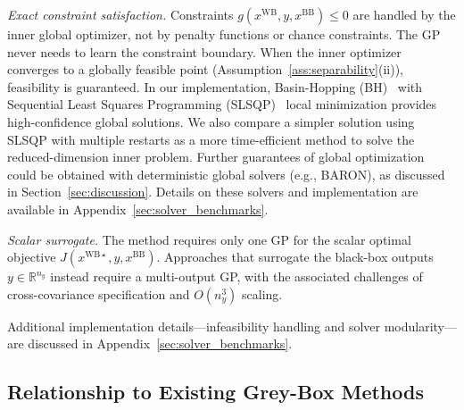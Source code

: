 \documentclass[12pt,a4paper]{article}%
\theoremstyle{plain}%
\theoremstyle{remark}%
\theoremstyle{definition}%
\def\WB{\mathrm{WB}}
\def\BB{\mathrm{BB}}
\begin{document}
\emph{Exact constraint satisfaction.} Constraints $g(x^{\WB}, y, x^{\BB}) \leq 0$ are handled by the inner global optimizer, not by penalty functions or chance constraints. The GP never needs to learn the constraint boundary. When the inner optimizer converges to a globally feasible point (Assumption~\ref{ass:separability}(ii)), feasibility is guaranteed. In our implementation, Basin-Hopping (BH)~\cite{wales2003energy,wales1997global, li1987monte, wales1999global, olson2012basin} with Sequential Least Squares Programming (SLSQP)~\cite{nocedal2006numerical, kraft1988software, lawson1995solving} local minimization provides high-confidence global solutions. We also compare a simpler solution using SLSQP with multiple restarts as a more time-efficient method to solve the reduced-dimension inner problem. Further guarantees of global optimization could be obtained with deterministic global solvers (e.g., BARON), as discussed in Section~\ref{sec:discussion}. Details on these solvers and implementation are available in Appendix~\ref{sec:solver_benchmarks}.

\emph{Scalar surrogate.} The method requires only one GP for the scalar optimal objective $J(x^{\WB\star}, y, x^{\BB})$. Approaches that surrogate the black-box outputs $y \in \mathbb{R}^{n_y}$ instead require a multi-output GP, with the associated challenges of cross-covariance specification and $O(n_y^3)$ scaling.

Additional implementation details---infeasibility handling and solver modularity---are discussed in Appendix~\ref{sec:solver_benchmarks}.

\subsection{Relationship to Existing Grey-Box Methods}\label{subsec:contrast_greybox_approaches}
\end{document}
